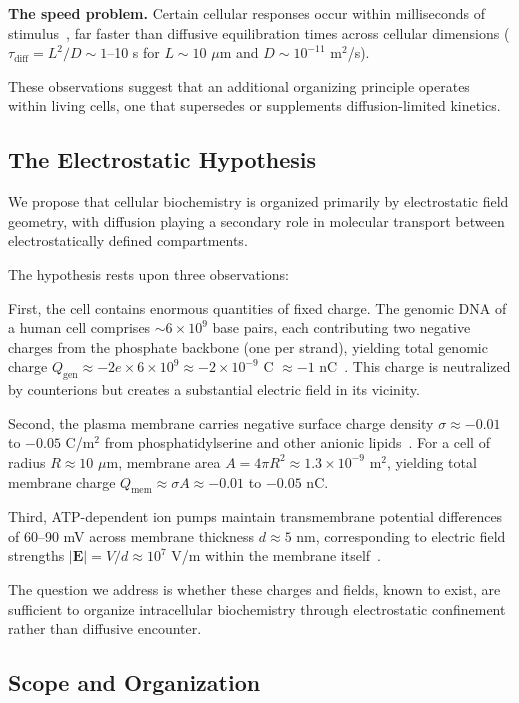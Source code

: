 \documentclass[twocolumn,10pt,aps,prd,superscriptaddress,floatfix,nofootinbib]{revtex4-2}
\theoremstyle{remark}
\newcommand{\Qgen}{Q_{\mathrm{gen}}}
\newcommand{\Qmem}{Q_{\mathrm{mem}}}
\begin{document}
\textbf{The speed problem.} Certain cellular responses occur within milliseconds of stimulus~\cite{Bhalla1999}, far faster than diffusive equilibration times across cellular dimensions ($\tau_{\mathrm{diff}} = L^2/D \sim 1$--10 s for $L \sim 10$ $\mu$m and $D \sim 10^{-11}$ m$^2$/s).

These observations suggest that an additional organizing principle operates within living cells, one that supersedes or supplements diffusion-limited kinetics.

\subsection{The Electrostatic Hypothesis}

We propose that cellular biochemistry is organized primarily by electrostatic field geometry, with diffusion playing a secondary role in molecular transport between electrostatically defined compartments.

The hypothesis rests upon three observations:

First, the cell contains enormous quantities of fixed charge. The genomic DNA of a human cell comprises $\sim 6 \times 10^{9}$ base pairs, each contributing two negative charges from the phosphate backbone (one per strand), yielding total genomic charge $\Qgen \approx -2e \times 6 \times 10^{9} \approx -2 \times 10^{-9}$ C $\approx -1$ nC~\cite{Manning1978}. This charge is neutralized by counterions but creates a substantial electric field in its vicinity.

Second, the plasma membrane carries negative surface charge density $\sigma \approx -0.01$ to $-0.05$ C/m$^2$ from phosphatidylserine and other anionic lipids~\cite{McLaughlin1989,Israelachvili2011}. For a cell of radius $R \approx 10$ $\mu$m, membrane area $A = 4\pi R^2 \approx 1.3 \times 10^{-9}$ m$^2$, yielding total membrane charge $\Qmem \approx \sigma A \approx -0.01$ to $-0.05$ nC.

Third, ATP-dependent ion pumps maintain transmembrane potential differences of 60--90 mV across membrane thickness $d \approx 5$ nm, corresponding to electric field strengths $|\mathbf{E}| = V/d \approx 10^{7}$ V/m within the membrane itself~\cite{Hille2001}.

The question we address is whether these charges and fields, known to exist, are sufficient to organize intracellular biochemistry through electrostatic confinement rather than diffusive encounter.

\subsection{Scope and Organization}
\end{document}
